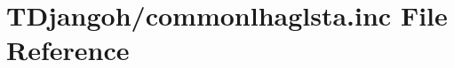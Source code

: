 \hypertarget{commonlhaglsta_8inc}{\section{T\+Djangoh/commonlhaglsta.inc File Reference}
\label{commonlhaglsta_8inc}
}
